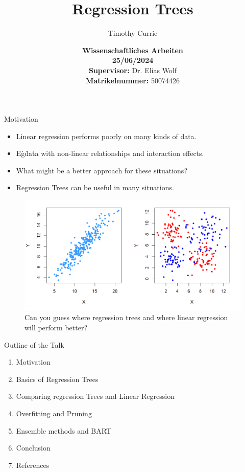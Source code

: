 \documentclass[10pt]{beamer}
\title{Regression Trees}
\author{Timothy Currie}
\institute{Universität Bonn}
\date{\vspace{2cm} \textbf{\large{Wissenschaftliches Arbeiten}} \\ \textbf{25/06/2024} \\
       \vspace{1cm} \textbf{Supervisor:} Dr. Elias Wolf \\
       \textbf{Matrikelnummer:} 50074426}
\begin{document}
\maketitle













\begin{frame}{Motivation}
    \begin{itemize}
        \item Linear regression performs poorly on many kinds of data.
        \item E\.g\. data with non-linear relationships and interaction effects.
        \item What might be a better approach for these situations?

        \item Regression Trees can be useful in many situations.
    \end{itemize}
    \begin{figure}
        \centering
        \includegraphics[scale=0.5]{Motivation Together.png}
        \caption{Can you guess where regression trees and where linear regression will perform better?}
        \label{fig:sub1}
    \end{figure}
\end{frame}






\begin{frame}{Outline of the Talk}
    \begin{large}
        \begin{enumerate}
            \item Motivation
            \item Basics of Regression Trees
            \item Comparing regression Trees and Linear Regression
            \item Overfitting and Pruning
            \item Ensemble methods and BART
            \item Conclusion
            \item References
        \end{enumerate}
    \end{large}
\end{frame}
\end{document}
